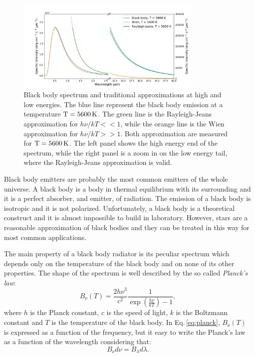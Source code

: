 \documentclass[../thesis.tex]{subfiles}
\begin{document}
\begin{figure}
\centering
\includegraphics[width=0.8\textwidth]{images/BB.jpg} 
\caption[]{Black body spectrum and traditional approximations at high and low energies. The blue line represent the black body emission at a temperature $\rm T = 5600\,\si{K}$. The green line is the Rayleigh-Jeans approximation for $h\nu/kT<<1$, while the orange line is the Wien approximation for $h\nu/kT>>1$. Both approximation are measured for $\rm T = 5600\,\si{K}$. The left panel shows the high energy end of the spectrum, while the right panel is a zoom in on the low energy tail, where the Rayleigh-Jeans approximation  is valid.}
\label{fig:BB_emission}
\end{figure}

Black body emitters are probably the most common emitters of the whole universe.
A black body is a body in thermal equilibrium with its surrounding and it is a perfect absorber, and emitter, of radiation.
The emission of a black body is isotropic and it is not polarized.
Unfortunately, a black body is a theoretical construct and it is almost impossible to build in laboratory.
However, stars are a reasonable approximation of black bodies and they can be treated in this way for most common applications.

The main property of a black body radiator is its peculiar spectrum which depends only on the temperature of the black body and on none of its other properties.
The shape of the spectrum is well described by the so called \emph{Planck's law}:
\begin{equation}
    \label{eq:planck}
    B_{\nu}(T) = \frac{2h\nu^3}{c^2}\frac{1}{\exp{\left(\frac{h\nu}{kT}\right)} - 1},
\end{equation}
where $h$ is the Planck constant, $c$ is the speed of light, $k$ is the Boltzmann constant and $T$ is the temperature of the black body.
In Eq.\,\ref{eq:planck}, $B_{\nu}(T)$ is expressed as a function of the frequency, but it easy to write the Planck's law as a function of the wavelength considering that:
\begin{equation}
    \label{eq:transform}
    B_{\nu}d\nu = B_{\lambda}d\lambda.
\end{equation}
\end{document}
